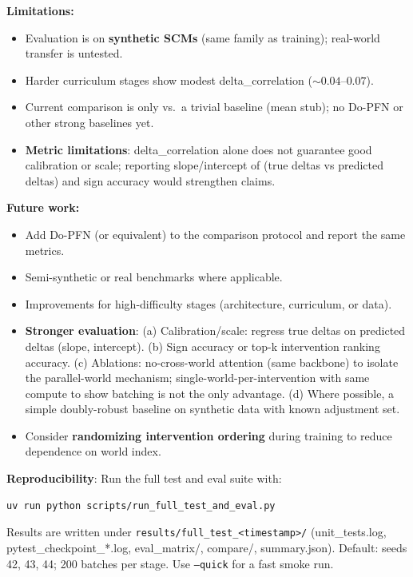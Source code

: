 \documentclass[12pt]{article}
\begin{document}
\textbf{Limitations:}

\begin{itemize}
    \item Evaluation is on \textbf{synthetic SCMs} (same family as training); real-world transfer is untested.
    \item Harder curriculum stages show modest delta\_correlation ($\sim 0.04$--$0.07$).
    \item Current comparison is only vs.\ a trivial baseline (mean stub); no Do-PFN or other strong baselines yet.
    \item \textbf{Metric limitations}: delta\_correlation alone does not guarantee good calibration or scale; reporting slope/intercept of (true deltas vs predicted deltas) and sign accuracy would strengthen claims.
\end{itemize}

\textbf{Future work:}

\begin{itemize}
    \item Add Do-PFN (or equivalent) to the comparison protocol and report the same metrics.
    \item Semi-synthetic or real benchmarks where applicable.
    \item Improvements for high-difficulty stages (architecture, curriculum, or data).
    \item \textbf{Stronger evaluation}: (a) Calibration/scale: regress true deltas on predicted deltas (slope, intercept). (b) Sign accuracy or top-k intervention ranking accuracy. (c) Ablations: no-cross-world attention (same backbone) to isolate the parallel-world mechanism; single-world-per-intervention with same compute to show batching is not the only advantage. (d) Where possible, a simple doubly-robust baseline on synthetic data with known adjustment set.
    \item Consider \textbf{randomizing intervention ordering} during training to reduce dependence on world index.
\end{itemize}

\textbf{Reproducibility}: Run the full test and eval suite with:

\begin{lstlisting}[language=bash]
uv run python scripts/run_full_test_and_eval.py
\end{lstlisting}

Results are written under \texttt{results/full\_test\_<timestamp>/} (unit\_tests.log, pytest\_checkpoint\_*.log, eval\_matrix/, compare/, summary.json). Default: seeds 42, 43, 44; 200 batches per stage. Use \texttt{--quick} for a fast smoke run.
\end{document}
